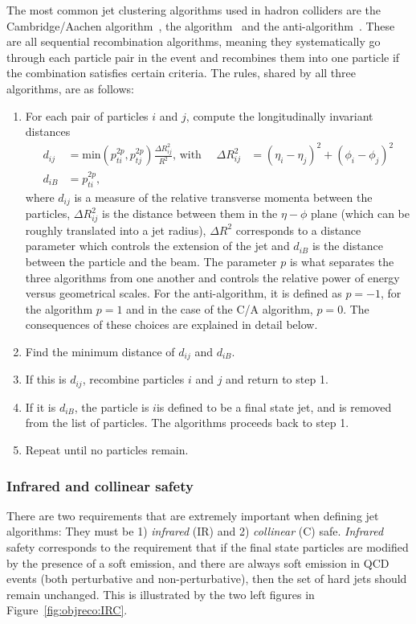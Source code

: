 The most common jet clustering algorithms used in hadron colliders are the Cambridge/Aachen algorithm~\cite{Dokshitzer:1997in}, the \kt algorithm~\cite{Ellis:1993tq} and the anti-\kt algorithm~\cite{Cacciari:2008gp}. These are all sequential recombination algorithms, meaning they systematically go through each particle pair in the event and recombines them into one particle if the combination satisfies certain criteria. The rules, shared by all three algorithms, are as follows:
\begin{enumerate}
\item For each pair of particles $i$ and $j$, compute the longitudinally invariant distances
  \begin{align}  
  d_{ij} &= \textrm{min}(p_{ti}^{2p},p_{tj}^{2p})\frac{\Delta R^2_{ij}}{R^2} \textrm{, with } \quad \Delta R^2_{ij}&=(\eta_i - \eta_j)^2+(\phi_i - \phi_j)^2\\
  d_{iB} &= p_{ti}^{2p},
  \end{align}  
  where $d_{ij}$ is a measure of the relative transverse momenta between the particles, $\Delta R^2_{ij}$ is the distance between them in the $\eta-\phi$ plane (which can be roughly translated into a jet radius), $\Delta R^2$ corresponds to a distance parameter which controls the extension of the jet and $d_{iB}$ is the distance between the particle and the beam. The parameter $p$ is what separates the three algorithms from one another and controls the relative power of energy versus geometrical
scales. For the anti-\kt algorithm, it is defined as $p=-1$, for the \kt algorithm $p=1$ and in the case of the C/A algorithm, $p=0$. The consequences of these choices are explained in detail below.
  \item Find the minimum distance of $d_{ij}$ and $d_{iB}$.
  \item If this is $d_{ij}$, recombine particles $i$ and $j$ and return to step 1.
  \item If it is $d_{iB}$, the particle is $i$is defined to be a final state jet, and is removed from the list of particles. The algorithms proceeds back to step 1.
  \item Repeat until no particles remain.
\end{enumerate}

\subsubsection{Infrared and collinear safety}
There are two requirements that are extremely important when defining jet algorithms: They must be 1) \textit{infrared} (IR) and 2) \textit{collinear} (C) safe.
\textit{Infrared} safety corresponds to the requirement that if the final state particles are modified by the presence of a soft emission, and there are always soft emission in QCD events (both perturbative and non-perturbative), then the set of hard jets should remain unchanged. This is illustrated by the two left figures in Figure~\ref{fig:objreco:IRC}.

